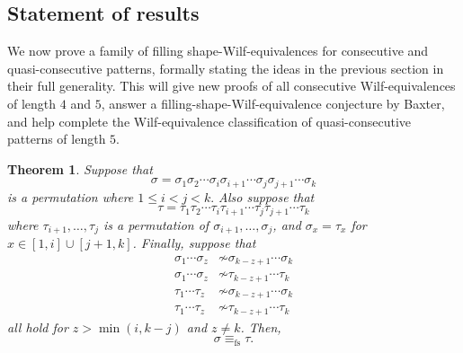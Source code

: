 \documentclass[11pt]{amsart}
\newtheorem{theorem}{Theorem}[section]
\theoremstyle{definition}
\begin{document}
\subsection{Statement of results}
\label{sec:BijectionCons}
We now prove a family of filling shape-Wilf-equivalences for
consecutive and quasi-consecutive patterns,
formally stating the ideas in the previous section in their full generality.
This will give new proofs of all consecutive Wilf-equivalences of length $4$ and $5$, answer a filling-shape-Wilf-equivalence conjecture by Baxter, and help complete the Wilf-equivalence classification of quasi-consecutive patterns of length $5$.

\begin{theorem} \label{thm:BijectionCons}
    Suppose that 
	\[ \sigma = \sigma_1\sigma_2\cdots\sigma_i\sigma_{i+1}\cdots
		\sigma_{j}\sigma_{j+1}\cdots\sigma_k \]
	is a permutation where $1 \le i < j < k.$ 
	Also suppose that 
	\[ \tau = \tau_1\tau_2\cdots\tau_i\tau_{i+1}\cdots
		\tau_j\tau_{j+1}\cdots\tau_k \]
	where $\tau_{i+1}, \dots, \tau_j$ is a permutation of
	$\sigma_{i+1}, \dots, \sigma_j$, and $\sigma_x = \tau_x$
	for $x \in [1,i] \cup [j+1, k]$.
	Finally, suppose that
	\begin{align*}
		\sigma_1\cdots\sigma_z &\not\sim \sigma_{k-z+1}\cdots\sigma_k \\
		\sigma_1\cdots\sigma_z &\not\sim \tau_{k-z+1}\cdots\tau_k \\
		\tau_1\cdots\tau_z &\not\sim \sigma_{k-z+1}\cdots\sigma_k \\
		\tau_1\cdots\tau_z &\not\sim \tau_{k-z+1}\cdots\tau_k
	\end{align*}
	all hold for $z > \min(i, k-j)$ and $z \neq  k$.
	Then, \[ \sigma \equiv_{\mathrm{fs}} \tau. \]
\end{theorem}
\end{document}
